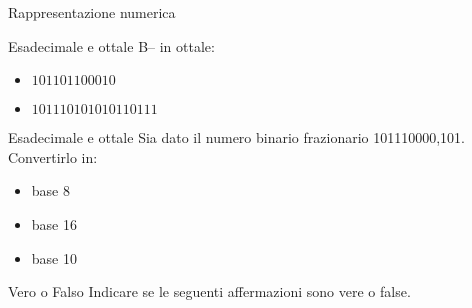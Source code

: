 \documentclass[11pt]{article}
\begin{document}
\begin{quiz}{Rappresentazione numerica}
\begin{cloze}[points=1,shuffle=false]{Esadecimale e ottale}
B-- in ottale:
\begin{itemize}
\item $101101100010$ 
\item $101110101010110111$ 
\end{itemize}
\end{cloze}

\begin{cloze}[points=1,shuffle=false]{Esadecimale e ottale}
Sia dato il numero binario frazionario 101110000,101. Convertirlo in:

\begin{itemize}
\item base 8 
\item base 16 
\item base 10 
\end{itemize}
\end{cloze}

\begin{cloze}[points=1,shuffle=false]{Vero o Falso}
Indicare se le seguenti affermazioni sono vere o false.


\end{cloze}
\end{quiz}
\end{document}
